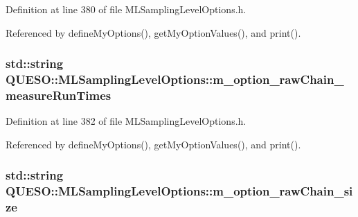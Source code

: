 Definition at line 380 of file M\-L\-Sampling\-Level\-Options.\-h.



Referenced by define\-My\-Options(), get\-My\-Option\-Values(), and print().

\hypertarget{class_q_u_e_s_o_1_1_m_l_sampling_level_options_a0dab337e638625987315c34660d8846e}{
\subsubsection[{m\-\_\-option\-\_\-raw\-Chain\-\_\-measure\-Run\-Times}]{\setlength{\rightskip}{0pt plus 5cm}std\-::string Q\-U\-E\-S\-O\-::\-M\-L\-Sampling\-Level\-Options\-::m\-\_\-option\-\_\-raw\-Chain\-\_\-measure\-Run\-Times\hspace{0.3cm}{\ttfamily [private]}}}\label{class_q_u_e_s_o_1_1_m_l_sampling_level_options_a0dab337e638625987315c34660d8846e}


Definition at line 382 of file M\-L\-Sampling\-Level\-Options.\-h.



Referenced by define\-My\-Options(), get\-My\-Option\-Values(), and print().

\hypertarget{class_q_u_e_s_o_1_1_m_l_sampling_level_options_a21f76f865e40198fc83406f617e396c1}{
\subsubsection[{m\-\_\-option\-\_\-raw\-Chain\-\_\-size}]{\setlength{\rightskip}{0pt plus 5cm}std\-::string Q\-U\-E\-S\-O\-::\-M\-L\-Sampling\-Level\-Options\-::m\-\_\-option\-\_\-raw\-Chain\-\_\-size\hspace{0.3cm}{\ttfamily [private]}}}\label{class_q_u_e_s_o_1_1_m_l_sampling_level_options_a21f76f865e40198fc83406f617e396c1}


